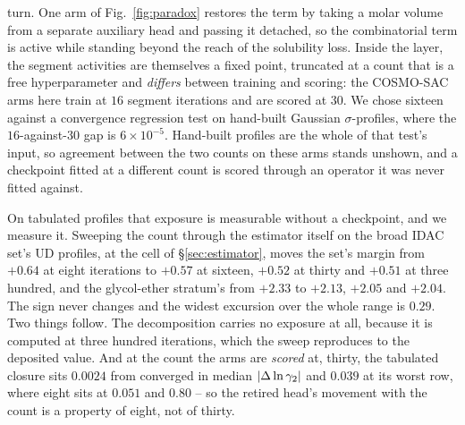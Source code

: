 turn. One arm of Fig.~\ref{fig:paradox} restores the term by taking a molar volume from a
separate auxiliary head and passing it detached, so the combinatorial term is active while standing
beyond the reach of the solubility loss. Inside the layer, the segment activities are themselves a fixed point, truncated at a count
that is a free hyperparameter and \emph{differs} between training and scoring: the COSMO-SAC arms
here train at $16$ segment iterations and are scored at $30$.
We chose sixteen against a
convergence regression test on hand-built Gaussian $\sigma$-profiles, where the $16$-against-$30$
gap is $6\times10^{-5}$. Hand-built profiles are the whole of that test's input, so agreement between the two counts on
these arms stands unshown, and a checkpoint fitted at a different count is scored through an
operator it was never fitted against.

On tabulated profiles that exposure is measurable without a checkpoint, and we measure it. Sweeping
the count through the estimator itself on the broad IDAC set's UD profiles, at the cell of
\S\ref{sec:estimator}, moves the set's margin from $+0.64$ at eight iterations to $+0.57$ at
sixteen, $+0.52$ at thirty and $+0.51$ at three hundred, and the glycol-ether stratum's from
$+2.33$ to $+2.13$, $+2.05$ and $+2.04$. The sign never changes and the widest excursion over the
whole range is $0.29$. Two things follow. The decomposition carries no exposure at all, because it
is computed at three hundred iterations, which the sweep reproduces to the deposited value. And at
the count the arms are \emph{scored} at, thirty, the tabulated closure sits $0.0024$ from converged
in median $\lvert\Delta\ln\gamma_2\rvert$ and $0.039$ at its worst row, where eight sits at $0.051$ and
$0.80$ -- so the retired head's movement with the count is a property of eight, not of thirty.

